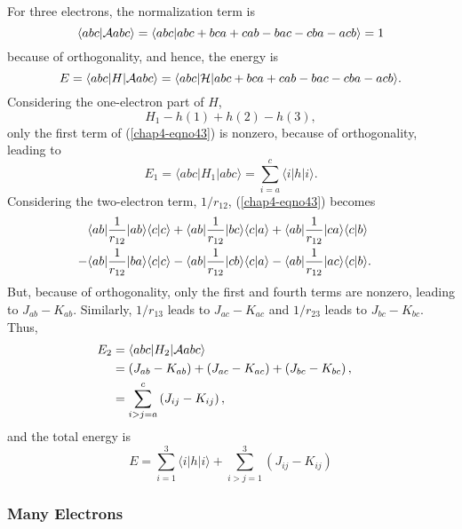 {For three electrons, the normalization term is
\begin{equation}
\langle abc | {\cal A} abc \rangle = \langle abc | abc + bca + cab - bac - 
cba - acb \rangle = 1
\end{equation}
because of orthogonality, and hence, the energy is
\begin{equation}
E = \langle abc | H | {\cal A} abc \rangle = \langle abc | {\cal 
H} | abc + bca + cab - bac - cba - acb \rangle .
\label{chap4-eqno43}
\end{equation}
Considering the one-electron part of $H$,
\begin{equation}
H_1 - h (1) + h (2) - h (3),
\end{equation}
only the first term of (\ref{chap4-eqno43}) is nonzero, because of
orthogonality, leading to
\begin{equation}
E_1 = \langle abc | H_1 | abc \rangle = \sum^{c}_{i=a} \langle i | 
h | i \rangle .
\end{equation}
Considering the two-electron term, $1/r_{12}$, (\ref{chap4-eqno43}) becomes
\begin{eqnarray}
\langle ab | {1 \over r_{12}} | ab \rangle \langle c | c 
\rangle & + \langle ab | {1 \over r_{12}} | bc \rangle \langle  
c | a \rangle + \langle ab | {1 \over r_{12}} | ca \rangle 
\langle c | b \rangle\cr
- \langle ab | {1 \over r_{12}} | ba \rangle \langle c | c 
\rangle & - \langle ab | {1 \over r_{12}} | cb \rangle \langle 
c | a \rangle - \langle ab | {1 \over r_{12}} | ac \rangle \langle c | 
b \rangle .\cr
\end{eqnarray}
But, because of orthogonality, only the first and fourth terms are nonzero, 
leading to $J_{ab} - K_{ab}$.  Similarly, $1/r_{13}$ leads to $J_{ac} - 
K_{ac}$ and $1/r_{23}$ leads to $J_{bc} - K_{bc}$.  Thus,
\begin{eqnarray}
E_2 &= \langle abc | H_2 | {\cal A} abc \rangle\cr
&= \left( J_{ab} - K_{ab} \right) + \left( J_{ac} - K_{ac} \right) + 
\left( J_{bc} - K_{bc} \right),\cr
&= \sum^{c}_{i>j=a} \left( J_{ij} - K_{ij} \right),\cr
\end{eqnarray}
and the total energy is
\begin{equation}
E = \sum^{3}_{i=1} \langle i | h | i \rangle + \sum^{3}_{i>j=1} \left( 
J_{ij} - K_{ij} \right)
\end{equation}

\subsubsection{Many Electrons}

}
